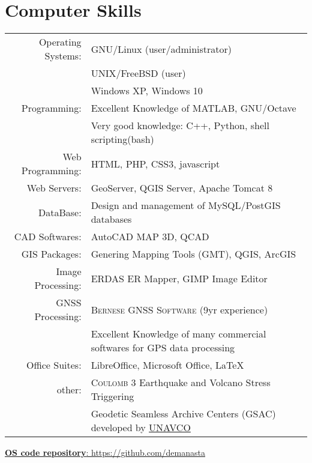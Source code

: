 \documentclass[a4paper]{Classes/cv_prof_en} %
\begin{document}
\section{Computer Skills}
\begin{tabular}{rl}
Operating Systems: & GNU/Linux (user/administrator)\\
		& UNIX/FreeBSD (user)\\
		& Windows XP, Windows 10\\
Programming: & Excellent Knowledge of MATLAB, GNU/Octave\\
		 & Very good knowledge: C++, Python, shell scripting(bash)\\
Web Programming: & HTML, PHP, CSS3, javascript\\
Web Servers: & GeoServer, QGIS Server, Apache Tomcat 8\\
DataBase: & Design and management of MySQL/PostGIS databases\\
CAD Softwares: & AutoCAD MAP 3D, QCAD\\
GIS Packages: & Genering Mapping Tools (GMT), QGIS, ArcGIS\\
Image Processing: & ERDAS ER Mapper, GIMP Image Editor\\
GNSS Processing: & \textsc{Bernese GNSS Software} (9yr experience)\\
		& Excellent Knowledge of many commercial softwares for GPS data processing\\
Office Suites: & LibreOffice, Microsoft Office, \LaTeX \\
other: & \textsc{Coulomb 3} Earthquake and Volcano Stress Triggering\\
	& Geodetic Seamless Archive Centers (GSAC) developed by \href{http://www.unavco.org/software/data-management/gsac/gsac.html}{UNAVCO}\\
\end{tabular}

\underline{\textbf{OS code repository}: \href{https://github.com/demanasta}{https://github.com/demanasta}}

\end{document}
